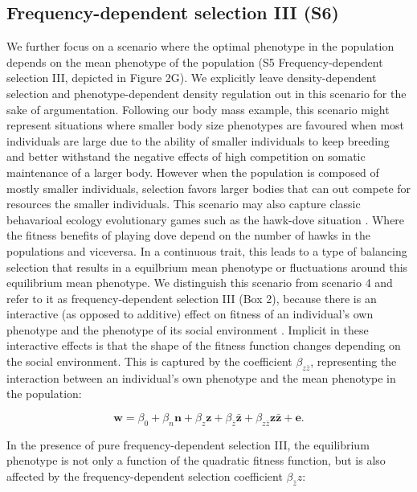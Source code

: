 \documentclass{article}
\begin{document}
 
\subsection{Frequency-dependent selection III (S6)}
We further focus on a scenario where the optimal phenotype in the population depends on the mean phenotype of the population (S5 Frequency-dependent selection III, depicted in Figure 2G). We explicitly leave density-dependent selection and phenotype-dependent density regulation out in this scenario for the sake of argumentation. Following our body mass example, this scenario might represent situations where smaller body size phenotypes are favoured when most individuals are large due to the ability of smaller individuals to keep breeding and better withstand the negative effects of high competition on somatic maintenance of a larger body. However when the population is composed of mostly smaller individuals, selection favors larger bodies that can out compete for resources the smaller individuals. This scenario may also capture classic behavarioal ecology evolutionary games such as the hawk-dove situation \citep{MaynardSmith1982}. Where the fitness benefits of playing dove depend on the number of hawks in the populations and viceversa. In a continuous trait, this leads to a type of balancing selection that results in a equilbrium mean phenotype or fluctuations around this equilibrium mean phenotype. We distinguish this scenario from scenario 4 and refer to it as frequency-dependent selection III (Box 2), because there is an interactive (as opposed to additive) effect on fitness of an individual's own phenotype and the phenotype of its social environment \citep{Araya-Ajoy2020}. Implicit in these interactive effects is that the shape of the fitness function changes depending on the social environment. This is captured by the coefficient $\beta_{z\bar{z}}$, representing the interaction between an individual's own phenotype and the mean phenotype in the population:  

\begin{equation} \label{eq: FDS}
\bm{w}=\beta_{0} +\beta_{n} \bm{n} + \beta_{z} \bm{z}+ \beta_{\bar{z}} \bm{\bar{z}}  + \beta_{z\bar{z}} \bm{z\bar{z}}  +  \bm{e}.
\end{equation}

\noindent In the presence of pure frequency-dependent selection III, the equilibrium phenotype is not only a function of the quadratic fitness function, but is also affected by the frequency-dependent selection coefficient $\beta_{\bar{z}}z$:
\end{document}
